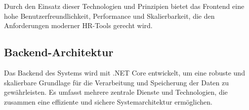 Durch den Einsatz dieser Technologien und Prinzipien bietet das Frontend eine hohe Benutzerfreundlichkeit, Performance und Skalierbarkeit, die den Anforderungen moderner HR-Tools gerecht wird.



\subsection{Backend-Architektur}

Das Backend des Systems wird mit .NET Core entwickelt, um eine robuste und skalierbare Grundlage für die Verarbeitung und Speicherung der Daten zu gewährleisten. Es umfasst mehrere zentrale Dienste und Technologien, die zusammen eine effiziente und sichere Systemarchitektur ermöglichen.\cite{azureArchitecture2024}


